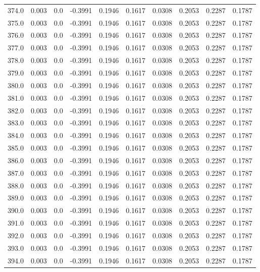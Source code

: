 \begin{longtable}{lrrrrrrrrr}
374.0 & 0.003 & 0.0 & -0.3991 & 0.1946 & 0.1617 & 0.0308 & 0.2053 & 0.2287 & 0.1787 \\
375.0 & 0.003 & 0.0 & -0.3991 & 0.1946 & 0.1617 & 0.0308 & 0.2053 & 0.2287 & 0.1787 \\
376.0 & 0.003 & 0.0 & -0.3991 & 0.1946 & 0.1617 & 0.0308 & 0.2053 & 0.2287 & 0.1787 \\
377.0 & 0.003 & 0.0 & -0.3991 & 0.1946 & 0.1617 & 0.0308 & 0.2053 & 0.2287 & 0.1787 \\
378.0 & 0.003 & 0.0 & -0.3991 & 0.1946 & 0.1617 & 0.0308 & 0.2053 & 0.2287 & 0.1787 \\
379.0 & 0.003 & 0.0 & -0.3991 & 0.1946 & 0.1617 & 0.0308 & 0.2053 & 0.2287 & 0.1787 \\
380.0 & 0.003 & 0.0 & -0.3991 & 0.1946 & 0.1617 & 0.0308 & 0.2053 & 0.2287 & 0.1787 \\
381.0 & 0.003 & 0.0 & -0.3991 & 0.1946 & 0.1617 & 0.0308 & 0.2053 & 0.2287 & 0.1787 \\
382.0 & 0.003 & 0.0 & -0.3991 & 0.1946 & 0.1617 & 0.0308 & 0.2053 & 0.2287 & 0.1787 \\
383.0 & 0.003 & 0.0 & -0.3991 & 0.1946 & 0.1617 & 0.0308 & 0.2053 & 0.2287 & 0.1787 \\
384.0 & 0.003 & 0.0 & -0.3991 & 0.1946 & 0.1617 & 0.0308 & 0.2053 & 0.2287 & 0.1787 \\
385.0 & 0.003 & 0.0 & -0.3991 & 0.1946 & 0.1617 & 0.0308 & 0.2053 & 0.2287 & 0.1787 \\
386.0 & 0.003 & 0.0 & -0.3991 & 0.1946 & 0.1617 & 0.0308 & 0.2053 & 0.2287 & 0.1787 \\
387.0 & 0.003 & 0.0 & -0.3991 & 0.1946 & 0.1617 & 0.0308 & 0.2053 & 0.2287 & 0.1787 \\
388.0 & 0.003 & 0.0 & -0.3991 & 0.1946 & 0.1617 & 0.0308 & 0.2053 & 0.2287 & 0.1787 \\
389.0 & 0.003 & 0.0 & -0.3991 & 0.1946 & 0.1617 & 0.0308 & 0.2053 & 0.2287 & 0.1787 \\
390.0 & 0.003 & 0.0 & -0.3991 & 0.1946 & 0.1617 & 0.0308 & 0.2053 & 0.2287 & 0.1787 \\
391.0 & 0.003 & 0.0 & -0.3991 & 0.1946 & 0.1617 & 0.0308 & 0.2053 & 0.2287 & 0.1787 \\
392.0 & 0.003 & 0.0 & -0.3991 & 0.1946 & 0.1617 & 0.0308 & 0.2053 & 0.2287 & 0.1787 \\
393.0 & 0.003 & 0.0 & -0.3991 & 0.1946 & 0.1617 & 0.0308 & 0.2053 & 0.2287 & 0.1787 \\
394.0 & 0.003 & 0.0 & -0.3991 & 0.1946 & 0.1617 & 0.0308 & 0.2053 & 0.2287 & 0.1787 \\

\end{longtable}
